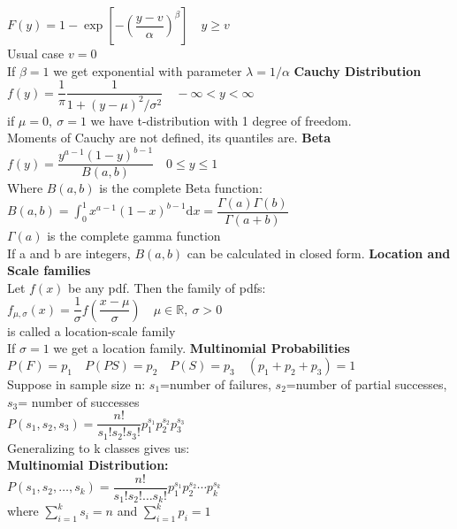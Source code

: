 \documentclass{article}
\newcommand{\dx}{\mathrm{d}x}
\begin{document}
\begin{flushleft}
$F(y)=1-\exp\left[-\left(\dfrac{y-v}{\alpha}\right)^{\beta} \right] \quad y\geq v$\\
Usual case $v=0$\\
If $\beta=1$ we get exponential with parameter $\lambda=1/\alpha$\medbreak
\textbf{Cauchy Distribution}\\
$f(y)=\dfrac{1}{\pi}\dfrac{1}{1+(y-\mu)^2/\sigma^2} \quad -\infty <y<\infty$\\
if $\mu=0, \ \sigma=1$ we have t-distribution with 1 degree of freedom.\\
Moments of Cauchy are not defined, its quantiles are.\medbreak
\textbf{Beta}\\
$f(y)=\dfrac{y^{a-1}(1-y)^{b-1}}{B(a,b)} \quad 0\leq y \leq 1$\\
Where $B(a,b)$ is the complete Beta function:\\
$B(a,b)=\int_{0}^{1}x^{a-1}(1-x)^{b-1}\dx =\dfrac{\Gamma(a)\Gamma(b)}{\Gamma(a+b)}$\\
$\Gamma(a)$ is the complete gamma function\\
If a and b are integers, $B(a,b)$ can be calculated in closed form.\medbreak
\textbf{Location and Scale families}\\
Let $f(x)$ be any pdf. Then the family of pdfs:\\
$f_{\mu,\sigma}(x)=\dfrac{1}{\sigma}f\left(\dfrac{x-\mu}{\sigma} \right) \quad \mu \in \mathbb{R}, \ \sigma>0$\\
is called a location-scale family\\
If $\sigma=1$ we get a location family.\medbreak
\textbf{Multinomial Probabilities}\\
$P(F)=p_1 \quad P(PS)=p_2 \quad P(S)=p_3 \quad (p_1+p_2+p_3)=1$\\
Suppose in sample size n: $s_1$=number of failures, $s_2$=number of partial successes, $s_3$= number of successes\\
$P(s_1,s_2,s_3)=\dfrac{n!}{s_1! s_2! s_3!}p_1^{s_1}p_2^{s_2}p_3^{s_3}$\\
Generalizing to k classes gives us:\\
\textbf{Multinomial Distribution:}\\
$P(s_1,s_2,\dots, s_k)=\dfrac{n!}{s_1!s_2!\dots s_k!}p_1^{s_1}p_2^{s_2} \cdots p_k^{s_k}$\\
where $\sum_{i=1}^{k}s_i=n$ and $\sum_{i=1}^{k}p_i=1$\medbreak

\end{flushleft}
\end{document}
